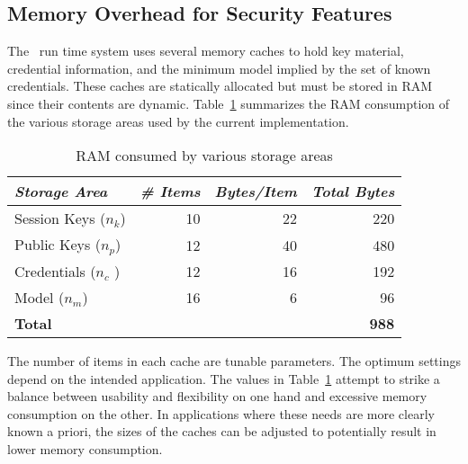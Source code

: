 \subsection{Memory Overhead for Security Features}
\label{section-sprocket-memory-performance}

The \Sprocket\ run time system uses several memory caches to hold key material, credential
information, and the minimum model implied by the set of known credentials. These caches are
statically allocated but must be stored in RAM since their contents are dynamic.
Table~\ref{table-ram-consumed} summarizes the RAM consumption of the various storage areas used
by the current implementation.

\begin{table}[!t]
  \newcommand\T{\rule{0pt}{2.1ex}}
  \centering
  \caption{RAM consumed by various storage areas}
  {
  \begin{tabular}{|l|r|r|r|} \hline
    \textit{Storage Area} \T & \textit{\# Items} & \textit{Bytes/Item} & \textit{Total Bytes} \\
    \hline \hline

    Session Keys ($n_k$) \T & 10 & 22 & 220 \\ \hline 
    Public Keys ($n_p$)  \T & 12 & 40 & 480 \\ \hline
    Credentials ($n_c$ ) \T & 12 & 16 & 192 \\ \hline
    Model ($n_m$)        \T & 16 &  6 &  96 \\ \hline \hline
    \textbf{Total} \T & \multicolumn{3}{r|}{ \textbf{988} } \\ \hline
  \end{tabular}
  }
  \label{table-ram-consumed}
\end{table}

The number of items in each cache are tunable parameters. The optimum settings depend on the
intended application. The values in Table~\ref{table-ram-consumed} attempt to strike a balance
between usability and flexibility on one hand and excessive memory consumption on the other. In
applications where these needs are more clearly known a priori, the sizes of the caches can be
adjusted to potentially result in lower memory consumption.


